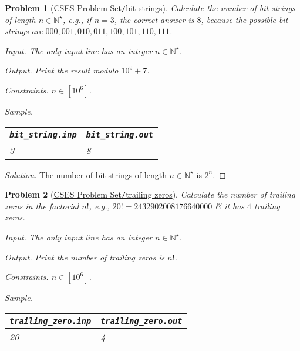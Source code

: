 \documentclass{article}
\newtheorem{problem}{Problem}
\begin{document}
\begin{problem}[\href{https://cses.fi/problemset/task/1617}{CSES Problem Set{\tt/}bit strings}]
    Calculate the number of bit strings of length $n\in\mathbb{N}^\star$, e.g., if $n = 3$, the correct answer is $8$, because the possible bit strings are $000,001,010,011,100,101,110,111$.
    \item {\sf Input.} The only input line has an integer $n\in\mathbb{N}^\star$.
    \item {\sf Output.} Print the result modulo $10^9 + 7$.
    \item {\sf Constraints.} $n\in[10^6]$.
    \item {\sf Sample.}
    \begin{table}[H]
        \centering
        \begin{tabular}{|l|l|}
            \hline
            \verb|bit_string.inp| & \verb|bit_string.out| \\
            \hline
            3 & 8 \\
            \hline
        \end{tabular}
    \end{table}
\end{problem}

\begin{proof}[Solution]
    The number of bit strings of length $n\in\mathbb{N}^\star$ is $2^n$.
\end{proof}

\begin{problem}[\href{https://cses.fi/problemset/task/1618}{CSES Problem Set{\tt/}trailing zeros}]
    Calculate the number of trailing zeros in the factorial $n!$, e.g., $20! = 2432902008176640000$ \& it has $4$ trailing zeros.
    \item {\sf Input.} The only input line has an integer $n\in\mathbb{N}^\star$.
    \item {\sf Output.} Print the number of trailing zeros is $n!$.
    \item {\sf Constraints.} $n\in[10^6]$.
    \item {\sf Sample.}
    \begin{table}[H]
        \centering
        \begin{tabular}{|l|l|}
            \hline
            \verb|trailing_zero.inp| & \verb|trailing_zero.out| \\
            \hline
            20 & 4 \\
            \hline
        \end{tabular}
    \end{table}
\end{problem}
\end{document}
